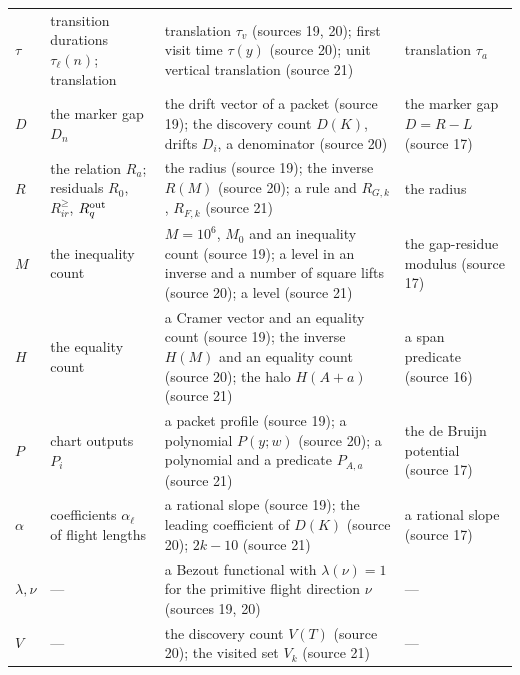 \documentclass[11pt,letterpaper]{article}
\numberwithin{equation}{section}
\theoremstyle{definition}
\theoremstyle{remark}
\begin{document}
\begin{center}
\begin{longtable}{@{}L{0.06\textwidth}L{0.22\textwidth}L{0.42\textwidth}L{0.2\textwidth}@{}}
$\tau$ & transition durations $\tau_\ell(n)$; translation & translation $\tau_v$ (sources 19, 20); first visit time $\tau(y)$ (source 20); unit vertical translation (source 21) & translation $\tau_a$\\
$D$ & the marker gap $D_n$ & the drift vector of a packet (source 19); the discovery count $D(K)$, drifts $D_i$, a denominator (source 20) & the marker gap $D=R-L$ (source 17)\\
$R$ & the relation $R_a$; residuals $R_0$, $R^{\ge}_{ir}$, $R^{\rm out}_q$ & the radius (source 19); the inverse $R(M)$ (source 20); a rule and $R_{G,k}$, $R_{F,k}$ (source 21) & the radius\\
$M$ & the inequality count & $M=10^6$, $M_0$ and an inequality count (source 19); a level in an inverse and a number of square lifts (source 20); a level (source 21) & the gap-residue modulus (source 17)\\
$H$ & the equality count & a Cramer vector and an equality count (source 19); the inverse $H(M)$ and an equality count (source 20); the halo $H(A+a)$ (source 21) & a span predicate (source 16)\\
$P$ & chart outputs $P_i$ & a packet profile (source 19); a polynomial $P(y;w)$ (source 20); a polynomial and a predicate $P_{A,a}$ (source 21) & the de Bruijn potential (source 17)\\
$\alpha$ & coefficients $\alpha_\ell$ of flight lengths & a rational slope (source 19); the leading coefficient of $D(K)$ (source 20); $2k-10$ (source 21) & a rational slope (source 17)\\
$\lambda,\nu$ & --- & a Bezout functional with $\lambda(\nu)=1$ for the primitive flight direction $\nu$ (sources 19, 20) & ---\\
$V$ & --- & the discovery count $V(T)$ (source 20); the visited set $V_k$ (source 21) & ---\\
\bottomrule
\end{longtable}
\addtocounter{table}{-1}
\end{center}
\end{document}
